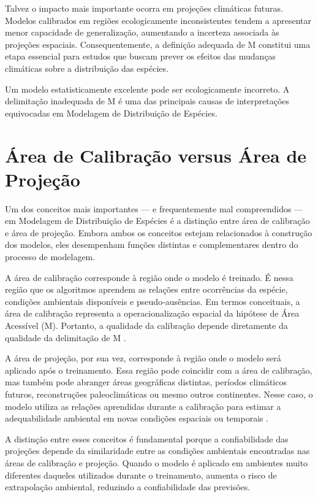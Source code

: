 Talvez o impacto mais importante ocorra em projeções climáticas futuras. Modelos calibrados em regiões ecologicamente inconsistentes tendem a apresentar menor capacidade de generalização, aumentando a incerteza associada às projeções espaciais. Consequentemente, a definição adequada de M constitui uma etapa essencial para estudos que buscam prever os efeitos das mudanças climáticas sobre a distribuição das espécies.

\begin{importantbox}
	Um modelo estatisticamente excelente pode ser ecologicamente incorreto. A delimitação inadequada de M é uma das principais causas de interpretações equivocadas em Modelagem de Distribuição de Espécies.
\end{importantbox}

\section{Área de Calibração versus Área de Projeção}

Um dos conceitos mais importantes — e frequentemente mal compreendidos — em Modelagem de Distribuição de Espécies é a distinção entre área de calibração e área de projeção. Embora ambos os conceitos estejam relacionados à construção dos modelos, eles desempenham funções distintas e complementares dentro do processo de modelagem.

A área de calibração corresponde à região onde o modelo é treinado. É nessa região que os algoritmos aprendem as relações entre ocorrências da espécie, condições ambientais disponíveis e pseudo-ausências. Em termos conceituais, a área de calibração representa a operacionalização espacial da hipótese de Área Acessível (M). Portanto, a qualidade da calibração depende diretamente da qualidade da delimitação de M \parencite{Barve2011,Peterson2011}.

A área de projeção, por sua vez, corresponde à região onde o modelo será aplicado após o treinamento. Essa região pode coincidir com a área de calibração, mas também pode abranger áreas geográficas distintas, períodos climáticos futuros, reconstruções paleoclimáticas ou mesmo outros continentes. Nesse caso, o modelo utiliza as relações aprendidas durante a calibração para estimar a adequabilidade ambiental em novas condições espaciais ou temporais \parencite{Elith2010,Zurell2020}.

A distinção entre esses conceitos é fundamental porque a confiabilidade das projeções depende da similaridade entre as condições ambientais encontradas nas áreas de calibração e projeção. Quando o modelo é aplicado em ambientes muito diferentes daqueles utilizados durante o treinamento, aumenta o risco de extrapolação ambiental, reduzindo a confiabilidade das previsões.

